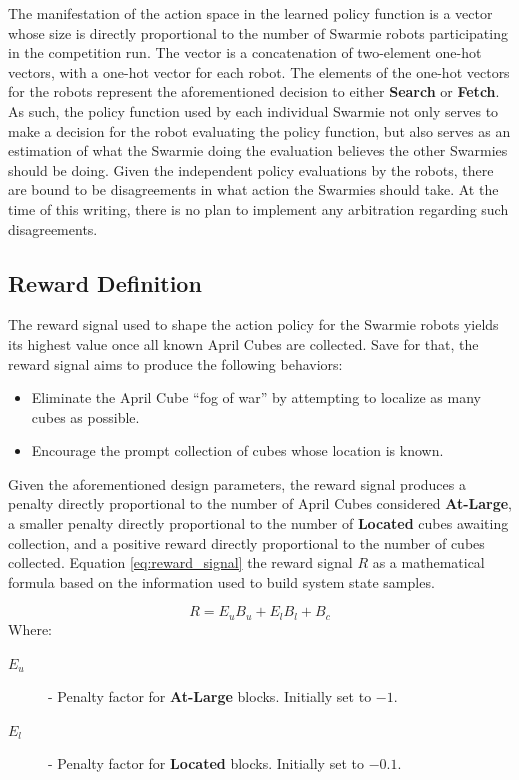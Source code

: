 \documentclass[sigconf,authordraft]{acmart}
\begin{document}
The manifestation of the action space in the learned policy function is a vector whose size is directly proportional to the number of Swarmie robots participating in the competition run. The vector is a concatenation of two-element one-hot vectors, with a one-hot vector for each robot. The elements of the one-hot vectors for the robots represent the aforementioned decision to either \textbf{Search} or \textbf{Fetch}. As such, the policy function used by each individual Swarmie not only serves to make a decision for the robot evaluating the policy function, but also serves as an estimation of what the Swarmie doing the evaluation believes the other Swarmies should be doing. Given the independent policy evaluations by the robots, there are bound to be disagreements in what action the Swarmies should take. At the time of this writing, there is no plan to implement any arbitration regarding such disagreements.

\subsection{Reward Definition}\label{subsec:reward_signal}
The reward signal used to shape the action policy for the Swarmie robots yields its highest value once all known April Cubes are collected. Save for that, the reward signal aims to produce the following behaviors:

\begin{itemize}
  \item Eliminate the April Cube ``fog of war'' by attempting to localize as many cubes as possible.
  \item Encourage the prompt collection of cubes whose location is known.
\end{itemize}

Given the aforementioned design parameters, the reward signal produces a penalty directly proportional to the number of April Cubes considered \textbf{At-Large}, a smaller penalty directly proportional to the number of \textbf{Located} cubes awaiting collection, and a positive reward directly proportional to the number of cubes collected. Equation \ref{eq:reward_signal} the reward signal $R$ as a mathematical formula based on the information used to build system state samples.

\begin{equation}\label{eq:reward_signal}
  R = E_uB_u + E_lB_l + B_c
\end{equation}
Where:
\begin{description}
  \item[$E_u$] - Penalty factor for \textbf{At-Large} blocks. Initially set to $-1$.
  \item[$E_l$] - Penalty factor for \textbf{Located} blocks. Initially set to $-0.1$. 
\end{description}
\end{document}

